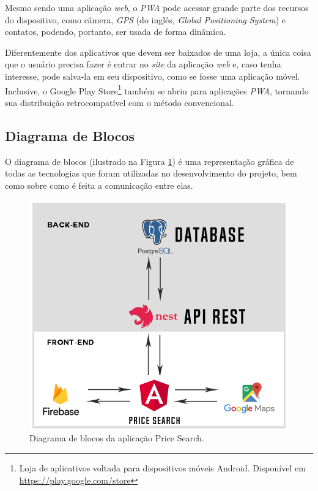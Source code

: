 Mesmo sendo uma aplicação \textit{web}, o \textit{PWA} pode acessar grande parte dos recursos do dispositivo, como câmera, \textit{GPS} (do inglês, \textit{Global Positioning System}) e contatos, podendo, portanto, ser usada de forma dinâmica.

Diferentemente dos aplicativos que devem ser baixados de uma loja, a única coisa que o usuário precisa fazer é entrar no \textit{site} da aplicação \textit{web} e, caso tenha interesse, pode salva-la em seu dispositivo, como se fosse uma aplicação móvel. Inclusive, o Google Play Store\footnote{Loja de aplicativos voltada para dispositivos móveis Android. Disponível em \url{https://play.google.com/store}} também se abriu para aplicações \textit{PWA}, tornando sua distribuição retrocompatível com o método convencional.


\subsection{Diagrama de Blocos}

 O diagrama de blocos (ilustrado na Figura  \ref{fig:diagrama_de_blocos}) é uma representação gráfica de todas as tecnologias que foram utilizadas no desenvolvimento do projeto, bem como sobre como é feita a comunicação entre elas.
 
\begin{figure}[!htb]
\centering
\includegraphics[width=\linewidth]{figuras/diagrama_de_blocos.png}
\caption{Diagrama de blocos da aplicação Price Search.}
\label{fig:diagrama_de_blocos}
\end{figure}
 
